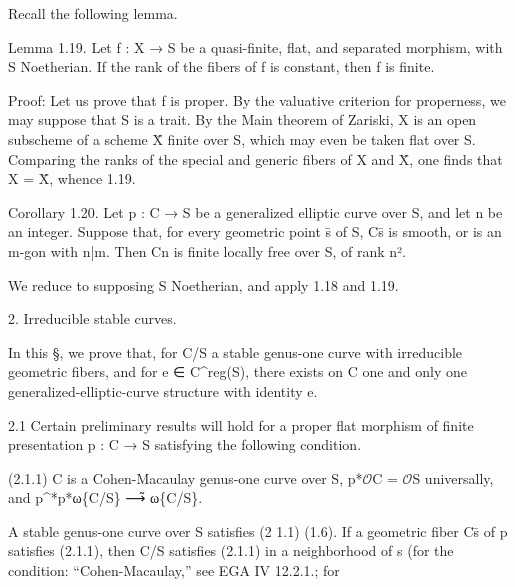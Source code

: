 \documentclass[11pt,a4paper]{article}
\begin{document}
Recall the following lemma.

Lemma 1.19.     Let f : X → S be a quasi-finite, flat, and separated morphism, with S Noetherian. If the rank of the fibers of f is constant, then f is finite.

Proof:     Let us prove that f is proper. By the valuative criterion for properness, we may suppose that S is a trait. By the Main theorem of Zariski, X is an open subscheme of a scheme X̄ finite over S, which may even be taken flat over S. Comparing the ranks of the special and generic fibers of X and X̄, one finds that X = X̄, whence 1.19.

Corollary 1.20.     Let p : C → S be a generalized elliptic curve over S, and let n be an integer. Suppose that, for every geometric point s̄ of S, C\textunderscore{}s̄ is smooth, or is an m-gon with n|m. Then C\textunderscore{}n is finite locally free over S, of rank n².

We reduce to supposing S Noetherian, and apply 1.18 and 1.19.

2. Irreducible stable curves.

In this §, we prove that, for C/S a stable genus-one curve with irreducible geometric fibers, and for e ∈ C\textasciicircum{}reg(S), there exists on C one and only one generalized-elliptic-curve structure with identity e.

2.1     Certain preliminary results will hold for a proper flat morphism of finite presentation p : C → S satisfying the following condition.

(2.1.1)     C is a Cohen-Macaulay genus-one curve over S, p\textunderscore{}*\ensuremath{\mathcal{O}}\textunderscore{}C = \ensuremath{\mathcal{O}}\textunderscore{}S universally, and p\textasciicircum{}*p\textunderscore{}*ω\textunderscore{}\{C/S\} ⟶̃ ω\textunderscore{}\{C/S\}.

A stable genus-one curve over S satisfies (2 1.1) (1.6). If a geometric fiber C\textunderscore{}s̄ of p satisfies (2.1.1), then C/S satisfies (2.1.1) in a neighborhood of s (for the condition: “Cohen-Macaulay,” see EGA IV 12.2.1.; for
\end{document}
